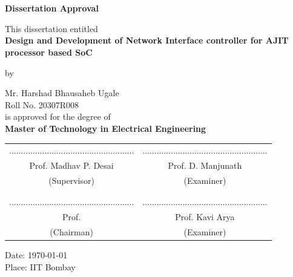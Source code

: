 \documentclass[a4paper,12pt, final]{report}
\begin{document}
\newpage
{}


\chapter*{}
\begin{center}
{\Large \textbf{Dissertation Approval}}

\bigskip
\bigskip
\bigskip
This dissertation entitled\\
\bigskip
\textbf{Design and Development of Network Interface controller for AJIT processor based SoC}\\
\bigskip

by\\
\bigskip

Mr. Harshad Bhausaheb Ugale\\
Roll No. 20307R008\\
\bigskip
is   approved for the degree of\\
\textbf{Master of Technology in Electrical Engineering}\\

\end{center}
 \vspace{10mm}
\begingroup
\setlength{\tabcolsep}{30pt}
\begin{center}
    \begin{tabular}{c c}
        ..................................................... & .....................................................\\
        Prof. Madhav P. Desai & Prof. D. Manjunath\\
        (Supervisor)     & (Examiner)\\
        \\\\
        ..................................................... & .....................................................\\
        Prof.   & Prof. Kavi Arya\\
        (Chairman) & (Examiner)\\
    \end{tabular}
\end{center}
\endgroup
\bigskip
{Date: \today}\\
{Place: IIT Bombay}


\newpage

 \linespread{1.5}
\end{document}

